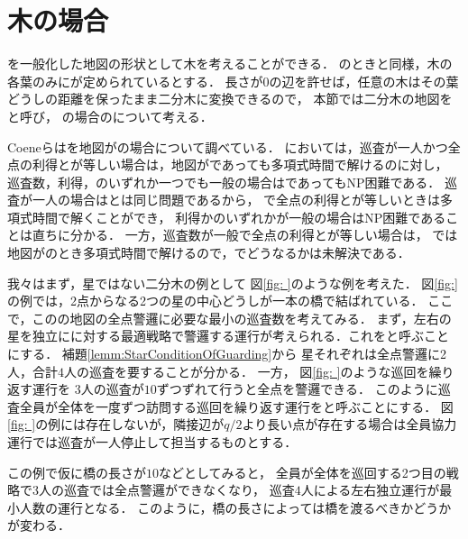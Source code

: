 \section*{木の場合}



{\graphStar}を一般化した地図の形状として木を考えることができる．
{\graphStar}のときと同様，木の各葉のみに{\maxIdletime}が定められているとする．
長さが$0$の辺を許せば，任意の木はその葉どうしの距離を保ったまま二分木に変換できるので，
本節では二分木の地図を{\graphTree}と呼び，
{\graphTree}の場合の{\patProb}について考える．

Coeneら\cite{coene2011charlemagne}は{\independentPatProb}を地図が{\graphTree}の場合について調べている．
{\independentPatProb}においては，巡査が一人かつ全点の利得と{\maxIdletime}が等しい場合は，地図が{\graphTree}であっても多項式時間で解ける\cite[Corollary~3]{coene2011charlemagne}のに対し，
巡査数，利得，{\maxIdletime}のいずれか一つでも一般の場合は{\graphStar}であってもNP困難である\cite[Theorems 5, 6 and 10]{coene2011charlemagne}．
巡査が一人の場合は{\patProb}と{\independentPatProb}は同じ問題であるから，
{\graphTree}で全点の利得と{\maxIdletime}が等しいときは多項式時間で解くことができ，
利得か{\maxIdletime}のいずれかが一般の場合はNP困難であることは直ちに分かる．
一方，巡査数が一般で全点の利得と{\maxIdletime}が等しい場合は，
{\patProb}では
地図が{\graphStar}のとき多項式時間で解けるので，{\graphTree}でどうなるかは未解決である．

\newcommand{\separatedPatroll}{左右独立運行}
\newcommand{\cooperativePatroll}{全員協力運行}

我々はまず，星ではない二分木の例として
図\ref{fig: }のような例を考えた．
図\ref{fig:}の例では，2点からなる2つの星の中心どうしが一本の橋で結ばれている．
ここで，この{\graphTree}の地図の全点警邏に必要な最小の巡査数を考えてみる．
%
まず，左右の星を独立に{\graphStar}に対する最適戦略で警邏する運行が考えられる．これを\defword{\separatedPatroll}と呼ぶことにする．
補題\ref{lemm:StarConditionOfGuarding}から
星それぞれは全点警邏に2人，合計$4$人の巡査を要することが分かる．
%
一方，
図\ref{fig: }のような巡回を繰り返す運行を
$3$人の巡査が{\maxIdletime}$10$ずつずれて行うと全点を警邏できる．
このように巡査全員が全体を一度ずつ訪問する巡回を繰り返す運行を\defword{\cooperativePatroll}と呼ぶことにする．
図\ref{fig: }の例には存在しないが，隣接辺が$q/2$より長い点が存在する場合は{\cooperativePatroll}では巡査が一人停止して担当するものとする．

この例で仮に橋の長さが$10$などとしてみると，
全員が全体を巡回する2つ目の戦略で$3$人の巡査では全点警邏ができなくなり，
巡査$4$人による{\separatedPatroll}が最小人数の運行となる．
このように，橋の長さによっては橋を渡るべきかどうかが変わる．

